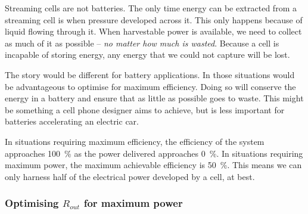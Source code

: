     Streaming cells are not batteries.
    The only time energy can be extracted from a streaming cell is when pressure developed across it.
    This only happens because of liquid flowing through it.
    When harvestable power is available, we need to collect as much of it as possible -- \emph{no matter how much is wasted}.
    Because a cell is incapable of storing energy, any energy that we could not capture will be lost.

    The story would be different for battery applications.
    In those situations would be advantageous to optimise for maximum efficiency.
    Doing so will conserve the energy in a battery and ensure that as little as possible goes to waste.
    This might be something a cell phone designer aims to achieve, but is less important for batteries accelerating an electric car.

    In situations requiring maximum efficiency, the efficiency of the system approaches \SI{100}{\percent} as the power delivered approaches \SI{0}{\percent}.
    In situations requiring maximum power, the maximum achievable efficiency is \SI{50}{\percent}.
    This means we can only harness half of the electrical power developed by a cell, at best.


    \subsubsection*{Optimising $R_{out}$ for maximum power}


